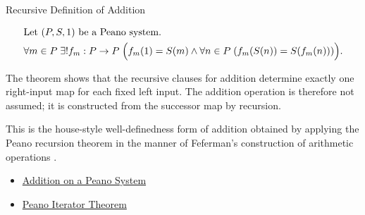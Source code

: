 \begin{topicbox}{Recursive Definition of Addition}
\begin{remark*}
\[
\begin{aligned}
&\text{Let } (P,S,1) \text{ be a Peano system.}\\
&\forall m \in P\;\exists! f_m : P \to P\;
\Bigl(f_m(1)=S(m) \land
\forall n \in P\;(f_m(S(n))=S(f_m(n)))\Bigr).
\end{aligned}
\]
\end{remark*}

\begin{remark*}[Interpretation]
The theorem shows that the recursive clauses for addition determine exactly one
right-input map for each fixed left input. The addition operation is therefore
not assumed; it is constructed from the successor map by recursion.
\end{remark*}

\begin{remark*}
This is the house-style well-definedness form of addition obtained by applying
the Peano recursion theorem in the manner of Feferman's construction of
arithmetic operations \citep{FefermanNumberSystems1964}.
\end{remark*}

\begin{dependencies}
\begin{itemize}
  \item \hyperref[def:addition-on-peano-system]{Addition on a Peano System}
  \item \hyperref[thm:peano-iterator-theorem]{Peano Iterator Theorem}
\end{itemize}
\end{dependencies}
\end{topicbox}

